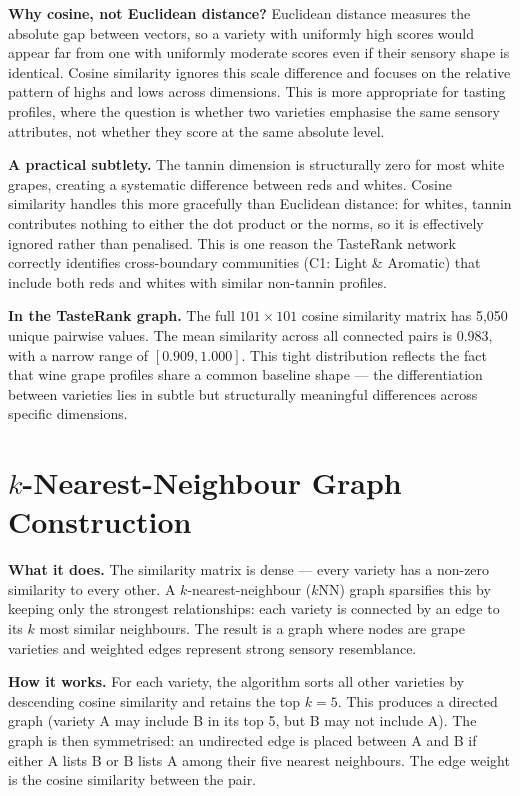 \documentclass[11pt]{article}
\begin{document}
\textbf{Why cosine, not Euclidean distance?} Euclidean distance measures the absolute gap between vectors, so a variety with uniformly high scores would appear far from one with uniformly moderate scores even if their sensory shape is identical. Cosine similarity ignores this scale difference and focuses on the relative pattern of highs and lows across dimensions. This is more appropriate for tasting profiles, where the question is whether two varieties emphasise the same sensory attributes, not whether they score at the same absolute level.

\textbf{A practical subtlety.} The tannin dimension is structurally zero for most white grapes, creating a systematic difference between reds and whites. Cosine similarity handles this more gracefully than Euclidean distance: for whites, tannin contributes nothing to either the dot product or the norms, so it is effectively ignored rather than penalised. This is one reason the TasteRank network correctly identifies cross-boundary communities (C1: Light \& Aromatic) that include both reds and whites with similar non-tannin profiles.

\textbf{In the TasteRank graph.} The full $101 \times 101$ cosine similarity matrix has 5{,}050 unique pairwise values. The mean similarity across all connected pairs is 0.983, with a narrow range of $[0.909, 1.000]$. This tight distribution reflects the fact that wine grape profiles share a common baseline shape --- the differentiation between varieties lies in subtle but structurally meaningful differences across specific dimensions.

\section{$k$-Nearest-Neighbour Graph Construction}

\textbf{What it does.} The similarity matrix is dense --- every variety has a non-zero similarity to every other. A $k$-nearest-neighbour ($k$NN) graph sparsifies this by keeping only the strongest relationships: each variety is connected by an edge to its $k$ most similar neighbours. The result is a graph where nodes are grape varieties and weighted edges represent strong sensory resemblance.

\textbf{How it works.} For each variety, the algorithm sorts all other varieties by descending cosine similarity and retains the top $k = 5$. This produces a directed graph (variety A may include B in its top 5, but B may not include A). The graph is then symmetrised: an undirected edge is placed between A and B if either A lists B or B lists A among their five nearest neighbours. The edge weight is the cosine similarity between the pair.
\end{document}
